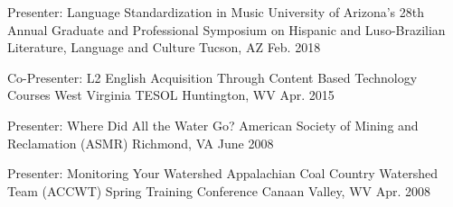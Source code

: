 
\begin{cventries}


\cventry
{Presenter: Language Standardization in Music} %
{University of Arizona’s 28th Annual Graduate and Professional Symposium on Hispanic and Luso-Brazilian Literature, Language and Culture} %
{Tucson, AZ} %
{Feb. 2018} %
{ %
\begin{cvitems}
\end{cvitems}
}
\vspace{-5mm}


\cventry
{Co-Presenter: L2 English Acquisition Through Content Based Technology Courses} %
{West Virginia TESOL} %
{Huntington, WV} %
{Apr. 2015} %
{ %
\begin{cvitems}
\end{cvitems}
}
\vspace{-5mm}


\cventry
{Presenter: Where Did All the Water Go?} %
{American Society of Mining and Reclamation (ASMR)} %
{Richmond, VA} %
{June 2008} %
{ %
\begin{cvitems}
\end{cvitems}
}
\vspace{-5mm}


\cventry
{Presenter: Monitoring Your Watershed} %
{Appalachian Coal Country Watershed Team (ACCWT) Spring Training Conference} %
{Canaan Valley, WV} %
{Apr. 2008} %
{ %
\begin{cvitems}
\end{cvitems}
}
\vspace{-5mm}


\end{cventries}
